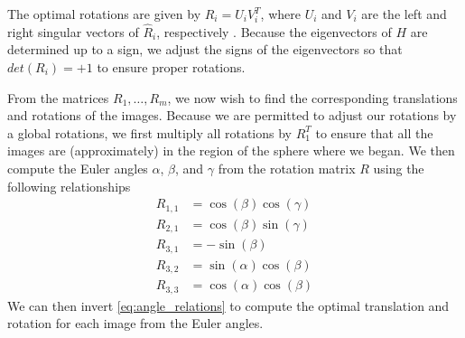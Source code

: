 \documentclass[11pt]{article}
\begin{document}
The optimal rotations are given by $R_i = U_i V_i^T$, where $U_i$ and $V_i$ are the left and right singular vectors of $\hat{R}_i$, respectively \cite{...}. 
%
Because the eigenvectors of $H$ are determined up to a sign, we adjust the signs of the eigenvectors so that $det(R_i) = +1$ to ensure proper rotations.
%

From the matrices $R_1, \dots, R_m$, we now wish to find the corresponding translations and rotations of the images.
%
Because we are permitted to adjust our rotations by a global rotations, we first multiply all rotations by $R_1^T$ to ensure that all the images are (approximately) in the region of the sphere where we began.
%
We then compute the Euler angles $\alpha$, $\beta$, and $\gamma$ from the rotation matrix $R$ using the following relationships
\begin{equation}
\begin{aligned}
R_{1,1} & = \cos(\beta)\cos(\gamma) \\
R_{2,1} & = \cos(\beta)\sin(\gamma) \\
R_{3,1} & = -\sin(\beta) \\
R_{3,2} & = \sin(\alpha)\cos(\beta) \\
R_{3,3} & = \cos(\alpha)\cos(\beta) 
\end{aligned}
\end{equation}
%
We can then invert \eqref{eq:angle_relations} to compute the optimal translation and rotation for each image from the Euler angles.




\end{document}
